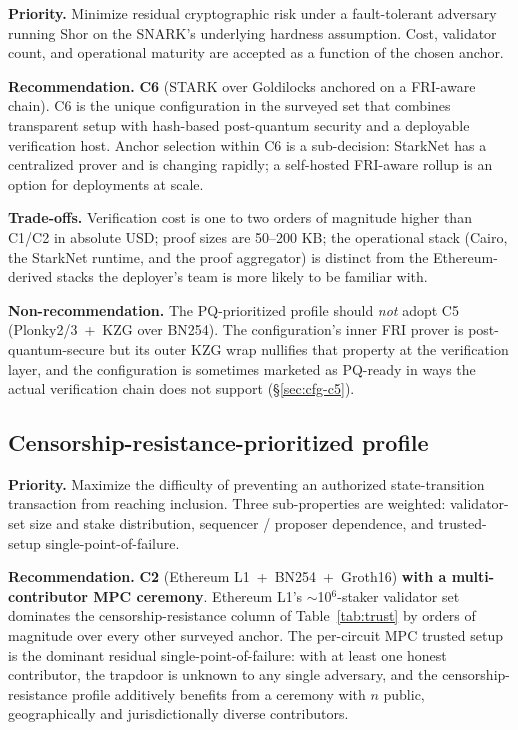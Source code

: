 \textbf{Priority.} Minimize residual cryptographic risk under a
fault-tolerant adversary running Shor on the SNARK's underlying
hardness assumption. Cost, validator count, and operational maturity
are accepted as a function of the chosen anchor.

\textbf{Recommendation.} \textbf{C6} (STARK over Goldilocks anchored
on a FRI-aware chain). C6 is the unique configuration in the
surveyed set that combines transparent setup with hash-based
post-quantum security and a deployable verification host. Anchor
selection within C6 is a sub-decision: StarkNet has a centralized
prover and is changing rapidly; a self-hosted FRI-aware rollup is an
option for deployments at scale.

\textbf{Trade-offs.} Verification cost is one to two orders of
magnitude higher than C1/C2 in absolute USD; proof sizes are 50--200
KB; the operational stack (Cairo, the StarkNet runtime, and the
proof aggregator) is distinct from the Ethereum-derived stacks the
deployer's team is more likely to be familiar with.

\textbf{Non-recommendation.} The PQ-prioritized profile should
\emph{not} adopt C5 (Plonky2/3~+~KZG over BN254). The configuration's
inner FRI prover is post-quantum-secure but its outer KZG wrap
nullifies that property at the verification layer, and the
configuration is sometimes marketed as PQ-ready in ways the actual
verification chain does not support
(\S\ref{sec:cfg-c5}).

\subsection{Censorship-resistance-prioritized profile}
\label{sec:rec-censorship}

\textbf{Priority.} Maximize the difficulty of preventing an
authorized state-transition transaction from reaching inclusion.
Three sub-properties are weighted: validator-set size and stake
distribution, sequencer / proposer dependence, and trusted-setup
single-point-of-failure.

\textbf{Recommendation.} \textbf{C2} (Ethereum L1~+~BN254~+~Groth16)
\textbf{with a multi-contributor MPC ceremony}. Ethereum L1's
$\sim$10$^6$-staker validator set dominates the censorship-resistance
column of Table~\ref{tab:trust} by orders of magnitude over every
other surveyed anchor. The per-circuit MPC trusted setup is the
dominant residual single-point-of-failure: with at least one honest
contributor, the trapdoor is unknown to any single adversary, and
the censorship-resistance profile additively benefits from a
ceremony with $n$ public, geographically and jurisdictionally
diverse contributors.

